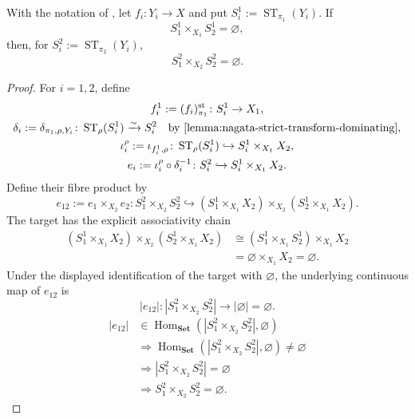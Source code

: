 \begin{lemma}
  \label{lemma:nagata-strict-transform-disjoint-dominating}

  With the notation of
  , let
  $f_i\colon Y_i\to X$ and put
  $S_i^1:=\operatorname{ST}_{\pi_1}(Y_i)$.  If
  \[
    S_1^1\times_{X_1}S_2^1=\varnothing,
  \]
  then, for $S_i^2:=\operatorname{ST}_{\pi_2}(Y_i)$,
  \[
    S_1^2\times_{X_2}S_2^2=\varnothing.
  \]
\end{lemma}

\begin{proof}
  For $i=1,2$, define
  \[
  \begin{gathered}
    f_i^1:=(f_i)_{\pi_1}^{\mathrm{st}}\colon S_i^1\to X_1,\\
    \delta_i:=\delta_{\pi_1,\rho,Y_i}\colon
      \operatorname{ST}_{\rho}(S_i^1)\xrightarrow{\sim}S_i^2
      \quad\text{by \Cref{lemma:nagata-strict-transform-dominating}},\\
    \iota_i^\rho:=\iota_{f_i^1,\rho}\colon
      \operatorname{ST}_{\rho}(S_i^1)
        \hookrightarrow S_i^1\times_{X_1}X_2,\\
    e_i:=\iota_i^\rho\circ\delta_i^{-1}\colon
      S_i^2\hookrightarrow S_i^1\times_{X_1}X_2.
  \end{gathered}
  \]
  Define their fibre product by
  \[
    e_{12}:=e_1\times_{X_2}e_2\colon
      S_1^2\times_{X_2}S_2^2
      \hookrightarrow
      (S_1^1\times_{X_1}X_2)
        \times_{X_2}(S_2^1\times_{X_1}X_2).
  \]
  The target has the explicit associativity chain
  \[
  \begin{aligned}
    (S_1^1\times_{X_1}X_2)
      \times_{X_2}(S_2^1\times_{X_1}X_2)
      &\cong(S_1^1\times_{X_1}S_2^1)\times_{X_1}X_2\\
      &=\varnothing\times_{X_1}X_2=\varnothing.
  \end{aligned}
  \]
  Under the displayed identification of the target with $\varnothing$, the
  underlying continuous map of $e_{12}$ is
  \[
    |e_{12}|\colon
      |S_1^2\times_{X_2}S_2^2|
        \longrightarrow|\varnothing|=\varnothing.
  \]
  \[
  \begin{aligned}
    |e_{12}|&\in
      \operatorname{Hom}_{\mathbf{Set}}
        (|S_1^2\times_{X_2}S_2^2|,\varnothing)\\
    &\Longrightarrow
      \operatorname{Hom}_{\mathbf{Set}}
        (|S_1^2\times_{X_2}S_2^2|,\varnothing)\neq\varnothing\\
    &\Longrightarrow
      |S_1^2\times_{X_2}S_2^2|=\varnothing\\
    &\Longrightarrow
      S_1^2\times_{X_2}S_2^2=\varnothing.
  \end{aligned}
  \]
\end{proof}


